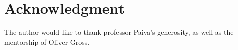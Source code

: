 \chapter*{Acknowledgment}
The author would like to thank professor Paiva's generosity,
as well as the mentorship of Oliver Gross.